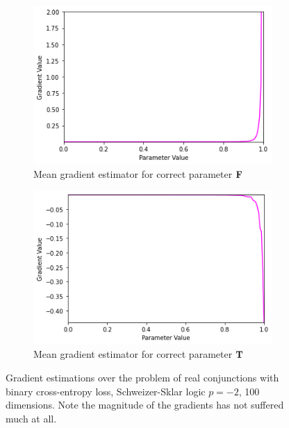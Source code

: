 \begin{figure}[h]
\begin{subfigure}[b]{0.47\textwidth}
        \includegraphics[width=\textwidth]{imgs/grad_ss_bce_falseparam_100dim_avg.png}
        \caption{Mean gradient estimator for correct parameter $\textbf{F}$}
        \label{fig:conjgrad100falseavgssbce}
    \end{subfigure}
    \begin{subfigure}[b]{0.47\textwidth}
        \centering
        \includegraphics[width=\textwidth]{imgs/grad_ss_bce_trueparam_100dim_avg.png}
        \caption{Mean gradient estimator for correct parameter $\textbf{T}$}
        \label{fig:conjgrad100trueavgssbce}
    \end{subfigure}
       \caption{Gradient estimations over the problem of real conjunctions with binary cross-entropy loss, Schweizer-Sklar logic $p=-2$, 100 dimensions. Note the magnitude of the gradients has not suffered much at all.}
       \label{fig:conjgrad100ssbce}
\end{figure}

